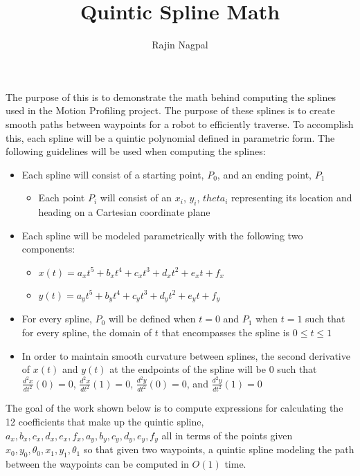 \documentclass[12pt, letterpaper]{article}
\title{Quintic Spline Math}
\author{Rajin Nagpal}
\date{}
\begin{document}
\maketitle

The purpose of this is to demonstrate the math behind computing the splines used in the Motion Profiling project. The purpose of these splines is to create smooth paths between waypoints for a robot to efficiently traverse. To accomplish this, each spline will be a quintic polynomial defined in parametric form. The following guidelines will be used when computing the splines: \begin{itemize}
\item Each spline will consist of a starting point, \(P_0\), and an ending point, \(P_1\) \begin{itemize}
\item Each point \(P_i\) will consist of an \(x_i\), \(y_i\), \(theta_i\) representing its location and heading on a Cartesian coordinate plane
\end{itemize}
\item Each spline will be modeled parametrically with the following two components: \begin{itemize}
\item \(x(t) = a_x t^5 + b_x t^4 + c_x t^3 + d_x t^2 + e_x t + f_x\)
\item \(y(t) = a_y t^5 + b_y t^4 + c_y t^3 + d_y t^2 + e_y t + f_y\)
\end{itemize}
\item For every spline, \(P_0\) will be defined when \(t = 0\) and \(P_1\) when \(t = 1\) such that for every spline, the domain of \(t\) that encompasses the spline is \(0 \leq t \leq 1\)
\item In order to maintain smooth curvature between splines, the second derivative of \(x(t)\) and \(y(t)\) at the endpoints of the spline will be \(0\) such that \(\frac{d^2x}{dt^2} (0) = 0\), \(\frac{d^2x}{dt^2} (1) = 0\), \(\frac{d^2y}{dt^2} (0) = 0\), and \(\frac{d^2y}{dt^2} (1) = 0\)
\end{itemize}

The goal of the work shown below is to compute expressions for calculating the 12 coefficients that make up the quintic spline, \(a_x, b_x, c_x, d_x, e_x, f_x, a_y, b_y, c_y, d_y, e_y, f_y\) all in terms of the points given \(x_0, y_0, \theta_0, x_1, y_1, \theta_1\) so that given two waypoints, a quintic spline modeling the path between the waypoints can be computed in \(O(1)\) time.
\end{document}

